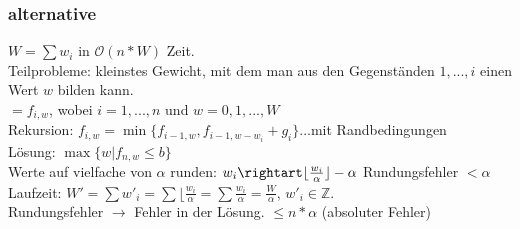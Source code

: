 \subsubsection*{alternative}
$W = \sum w_i$ in $\mathcal{O}(n*W)$ Zeit.\\
Teilprobleme: kleinstes Gewicht, mit dem man aus den Gegenständen $1,...,i$ einen Wert $w$ bilden kann.\\
$= f_{i,w}$, wobei $i = 1,...,n$ und $w = 0,1,...,W$\\
Rekursion: $f_{i,w} = \min\{ f_{i-1,w},f_{i-1,w-w_i} +g_i\}$...mit Randbedingungen\\
Lösung: $\max\{ w | f_{n,w} \leq b\}$\\
Werte auf vielfache von $\alpha$ runden: $w_i \rightart \lfloor \frac{w_i}{\alpha}\rfloor - \alpha$ Rundungsfehler $< \alpha$\\
Laufzeit: $W' = \sum w'_i = \sum \lfloor \frac{w_i}{\alpha} = \sum \frac{w_i}{\alpha} = \frac{W}{\alpha}$, $w'_i \in \mathbb{Z}$.\\
Rundungsfehler $\rightarrow$ Fehler in der Lösung. $\leq n*\alpha$ (absoluter Fehler)\\

